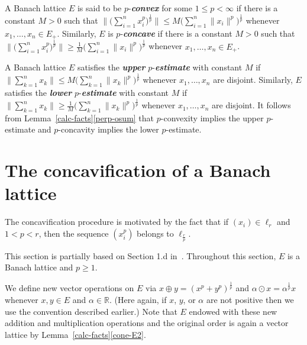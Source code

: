 \documentclass[12pt]{amsart}
\theoremstyle{plain}
\theoremstyle{definition}
\newcommand{\norm}[1]{\lVert#1\rVert}
\newcommand{\bignorm}[1]{\bigl\lVert#1\bigr\rVert}
\renewcommand{\le}{\leqslant}
\renewcommand{\ge}{\geqslant}
\newcommand{\term}[1]{{\textit{\textbf{#1}}}}
\begin{document}
A Banach lattice $E$ is said to be $p$-\term{convex} for some $1\le p<\infty$
if there is a constant $M>0$ such that
\begin{math}
 \bignorm{\bigl(\sum_{i=1}^nx_i^p\bigr)^{\frac{1}{p}}}
 \le M\bigl(\sum_{i=1}^n\norm{x_i}^p\bigr)^{\frac{1}{p}}
\end{math}
whenever $x_1,\dots,x_n\in E_+$. Similarly, $E$ is $p$-\term{concave}
if  there is a constant $M>0$ such that
\begin{math}
 \bignorm{\bigl(\sum_{i=1}^nx_i^p\bigr)^{\frac{1}{p}}}
 \ge\frac{1}{M}\bigl(\sum_{i=1}^n\norm{x_i}^p\bigr)^{\frac{1}{p}}
\end{math}
whenever $x_1,\dots,x_n\in E_+$.


A Banach lattice $E$ satisfies the \term{upper}
$p$-\term{estimate} with constant $M$ if
\begin{math}
  \bignorm{\sum_{k=1}^nx_k}
  \le M\bigl(\sum_{k=1}^n\norm{x_k}^p\bigr)^{\frac{1}{p}}
\end{math}
whenever $x_1,\dots,x_n$ are disjoint. Similarly,
$E$ satisfies the \term{lower}
$p$-\term{estimate} with constant $M$ if
\begin{math}
  \bignorm{\sum_{k=1}^nx_k}
  \ge\tfrac{1}{M}\bigl(\sum_{k=1}^n\norm{x_k}^p\bigr)^{\frac{1}{p}}
\end{math}
whenever $x_1,\dots,x_n$ are disjoint.  It follows from
Lemma~\ref{calc-facts}\eqref{perp-osum}
that $p$-convexity implies the
upper $p$-estimate and $p$-concavity implies the lower $p$-estimate.



\section{The concavification of a Banach lattice}

The concavification procedure is motivated by the fact that if
$(x_i)\in\ell_r$ and $1<p<r$, then the sequence $(x_i^p)$ belongs to
$\ell_{\frac{r}{p}}$.

This section is partially based on Section 1.d in~\cite{Lindenstrauss:79}.
Throughout this section, $E$ is a Banach lattice and $p\ge 1$.

We define new vector operations on $E$ via
\begin{math}
  x\oplus y=(x^p+y^p)^{\frac{1}{p}}
\end{math}
and
\begin{math}
  \alpha\odot x=\alpha^{\frac{1}{p}}x  
\end{math}
whenever $x,y\in E$ and $\alpha\in\mathbb R$. (Here again, if $x$,
$y$, or $\alpha$ are not positive then we use the convention described
earlier.) Note that $E$ endowed with these new addition and
multiplication operations and the original order is again a vector lattice by
Lemma~\ref{calc-facts}\eqref{cone-E2}.
\end{document}
